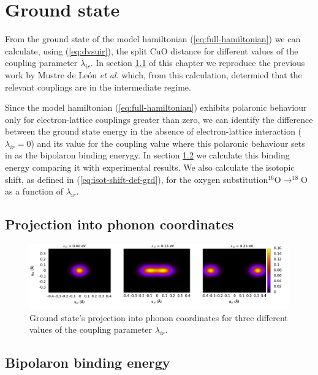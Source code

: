 \chapter{Ground state}
\label{chap:ground}

From the ground state of the model hamiltonian (\ref{eq:full-hamiltonian}) we can calculate, using (\ref{eq:dvsuir}), the split CuO distance for different values of the coupling parameter $\lambda_{ir}$.
In section \ref{sec:grd-phonon-proj} of this chapter we reproduce the previous work by Mustre de Le\'{o}n \textit{et al.} \cite{MustredeLeon1992} which, from this calculation, determied that the relevant couplings are in the intermediate regime.

Since the model hamiltonian (\ref{eq:full-hamiltonian}) exhibits polaronic behaviour only for electron-lattice couplings greater than zero, we can identify the difference between the ground state energy in the absence of electron-lattice interaction ($\lambda_{ir}=0$) and its value for the coupling value where this polaronic behaviour sets in as the bipolaron binding enerygy.
In section \ref{sec:grd-binding-energy} we calculate this binding energy comparing it with experimental results.
We also calculate the isotopic shift, as defined in (\ref{eq:isot-shift-def-grd}), for the oxygen substitution$^{16}$O$\rightarrow ^{18}$O as a function of $\lambda_{ir}$.

\section{Projection into phonon coordinates}
\label{sec:grd-phonon-proj}


\begin{figure}[ht!]
  \centering
  \includegraphics[width=1.0\textwidth]{images/ph-ground.png}
  \caption{Ground state's projection into phonon coordinates for three different values of the coupling parameter $\lambda_{ir}$.}
  \label{fig:ph-ground}
\end{figure}

\section{Bipolaron binding energy}
\label{sec:grd-binding-energy}

